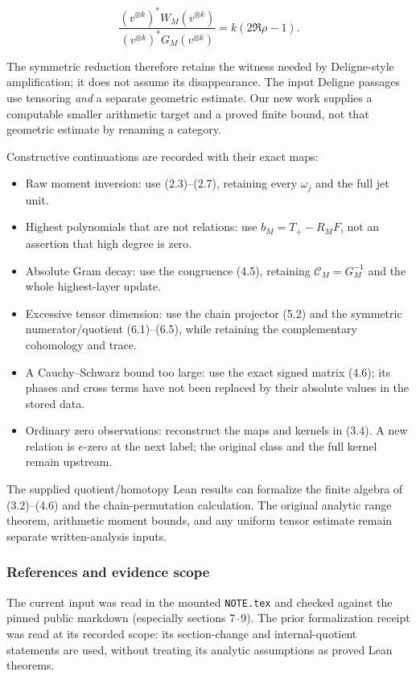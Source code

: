 \[\frac{(v^{\otimes k})^*W_M(v^{\otimes k})}
{(v^{\otimes k})^*G_M(v^{\otimes k})}
=k(2\Re\rho-1).\tag{8.1}\]

The symmetric reduction therefore retains the witness needed by
Deligne-style amplification; it does not assume its disappearance. The
input Deligne passages use tensoring \emph{and} a separate geometric
estimate. Our new work supplies a computable smaller arithmetic target
and a proved finite bound, not that geometric estimate by renaming a
category.

Constructive continuations are recorded with their exact maps:

\begin{itemize}
\tightlist
\item
  Raw moment inversion: use (2.3)--(2.7), retaining every \(\omega_j\)
  and the full jet unit.
\item
  Highest polynomials that are not relations: use \(b_M=T_+-R_MF\), not
  an assertion that high degree is zero.
\item
  Absolute Gram decay: use the congruence (4.5), retaining
  \(\mathcal C_M=G_M^{-1}\) and the whole highest-layer update.
\item
  Excessive tensor dimension: use the chain projector (5.2) and the
  symmetric numerator/quotient (6.1)--(6.5), while retaining the
  complementary cohomology and trace.
\item
  A Cauchy--Schwarz bound too large: use the exact signed matrix (4.6);
  its phases and cross terms have not been replaced by their absolute
  values in the stored data.
\item
  Ordinary zero observations: reconstruct the maps and kernels in (3.4).
  A new relation is \(e\)-zero at the next label; the original class and
  the full kernel remain upstream.
\end{itemize}

The supplied quotient/homotopy Lean results can formalize the finite
algebra of (3.2)--(4.6) and the chain-permutation calculation. The
original analytic range theorem, arithmetic moment bounds, and any
uniform tensor estimate remain separate written-analysis inputs.

\subsubsection{References and evidence
scope}\label{symmetric_frontier:references-and-evidence-scope}

The current input was read in the mounted \nolinkurl{NOTE.tex} and checked
against the pinned public markdown (especially sections 7--9). The prior
formalization receipt was read at its recorded scope: its section-change
and internal-quotient statements are used, without treating its analytic
assumptions as proved Lean theorems.

